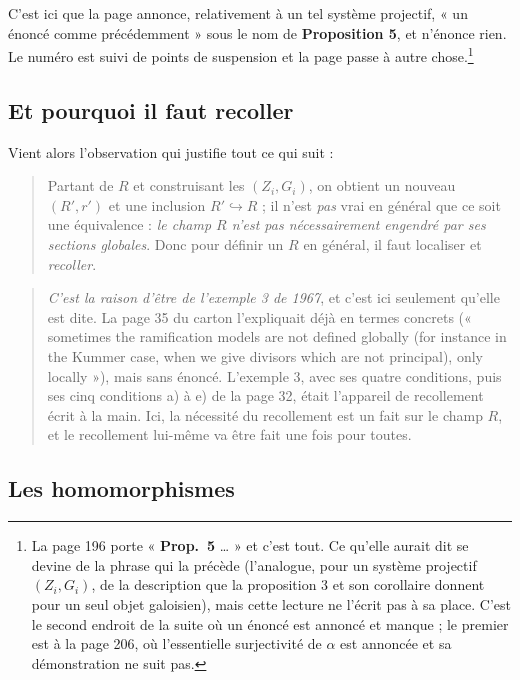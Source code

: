 \documentclass[11pt,a4paper]{article}
\begin{document}
C'est ici que la page annonce, relativement à un tel système projectif, « un
énoncé comme précédemment » sous le nom de \textbf{Proposition 5}, et
n'énonce rien. Le numéro est suivi de points de suspension et la page passe à
autre chose.\footnote{La page 196 porte « \textbf{Prop.\ 5} … » et
c'est tout. Ce qu'elle aurait dit se devine de la phrase qui la précède
(l'analogue, pour un système projectif $(Z_i, G_i)$, de la description que la
proposition 3 et son corollaire donnent pour un seul objet galoisien), mais
cette lecture ne l'écrit pas à sa place.
C'est le second endroit de la suite où un énoncé est annoncé et manque ; le
premier est à la page 206, où l'essentielle surjectivité de $\alpha$ est
annoncée et sa démonstration ne suit pas.}

\subsection*{Et pourquoi il faut recoller}

Vient alors l'observation qui justifie tout ce qui suit :

\begin{quote}
Partant de $R$ et construisant les $(Z_{i}, G_{i})$, on obtient un nouveau
$(R', r')$ et une inclusion $R' \hookrightarrow R$ ; il n'est \emph{pas} vrai
en général que ce soit une équivalence : \emph{le champ $R$ n'est pas
nécessairement engendré par ses sections globales}. Donc pour définir un $R$ en
général, il faut localiser et \emph{recoller}.
\end{quote}

\begin{quote}
\emph{C'est la raison d'être de l'exemple 3 de 1967}, et c'est ici seulement
qu'elle est dite. La page 35 du carton l'expliquait déjà en termes concrets
(« sometimes the ramification models are not defined globally (for instance in
the Kummer case, when we give divisors which are not principal), only locally »),
mais sans énoncé. L'exemple 3, avec ses quatre conditions, puis ses cinq
conditions a) à e) de la page 32, était l'appareil de recollement écrit à la
main. Ici, la nécessité du recollement est un fait sur le champ $R$, et le
recollement lui-même va être fait une fois pour toutes.
\end{quote}

\subsection*{Les homomorphismes}
\end{document}
